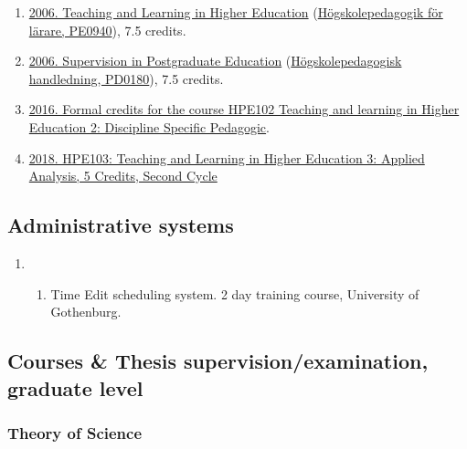 \documentclass[
]{article}
\providecommand{\tightlist}{%
  \setlength{\itemsep}{0pt}\setlength{\parskip}{0pt}}
\begin{document}
\begin{enumerate}
\def\labelenumi{\arabic{enumi}.}
\tightlist
\item
  \href{http://files.christopherkullenberg.se/hogskolepedagogikonline.pdf}{2006.
  Teaching and Learning in Higher Education}
  (\href{http://files.christopherkullenberg.se/PE0940.pdf}{Högskolepedagogik
  för lärare, PE0940}), 7.5 credits.
\item
  \href{http://files.christopherkullenberg.se/hogskolepedagogikonline.pdf}{2006.
  Supervision in Postgraduate Education}
  (\href{http://files.christopherkullenberg.se/PD0180.pdf}{Högskolepedagogisk
  handledning, PD0180}), 7.5 credits.
\item
  \href{http://kursplaner.gu.se/svenska/HPE102.pdf}{2016. Formal credits
  for the course HPE102 Teaching and learning in Higher Education 2:
  Discipline Specific Pedagogic}.
\item
  \href{http://kursplaner.gu.se/svenska/HPE103.pdf}{2018. HPE103:
  Teaching and Learning in Higher Education 3: Applied Analysis, 5
  Credits, Second Cycle}
\end{enumerate}

\hypertarget{administrative-systems}{%
\subsection{Administrative systems}\label{administrative-systems}}

\begin{enumerate}
\def\labelenumi{\arabic{enumi}.}
\item
  \begin{enumerate}
  \def\labelenumii{\arabic{enumii}.}
  \setcounter{enumii}{2023}
  \tightlist
  \item
    Time Edit scheduling system. 2 day training course, University of
    Gothenburg.
  \end{enumerate}
\end{enumerate}

\hypertarget{courses-thesis-supervisionexamination-graduate-level}{%
\subsection{Courses \& Thesis supervision/examination, graduate
level}\label{courses-thesis-supervisionexamination-graduate-level}}

\hypertarget{theory-of-science}{%
\subsubsection{Theory of Science}\label{theory-of-science}}
\end{document}
